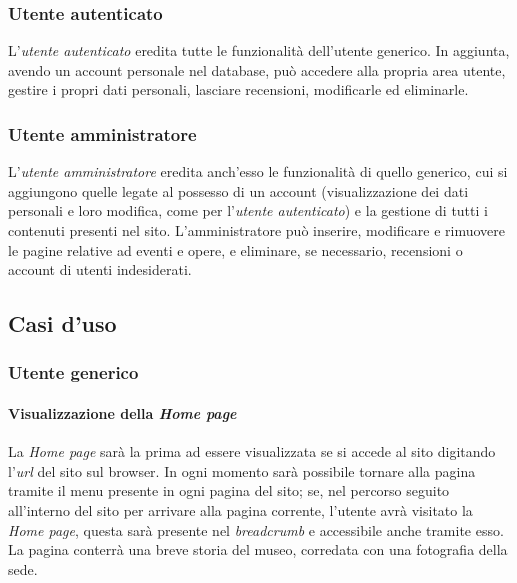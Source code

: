 \subsubsection{Utente autenticato}
\label{analisi-casi-uso-attori-principali-utente-autenticato}
L'\textit{utente autenticato} eredita tutte le funzionalità dell'utente generico. In aggiunta, avendo un account personale nel database, può accedere alla propria area utente, gestire i propri dati personali, lasciare recensioni, modificarle ed eliminarle.

\subsubsection{Utente amministratore}
\label{analisi-casi-uso-attori-principali-utente-amministratore}
L'\textit{utente amministratore} eredita anch'esso le funzionalità di quello generico, cui si aggiungono quelle legate al possesso di un account (visualizzazione dei dati personali e loro modifica, come per l'\textit{utente autenticato}) e  la gestione di tutti i contenuti presenti nel sito. L'amministratore può inserire, modificare e rimuovere le pagine relative ad eventi e opere, e eliminare, se necessario, recensioni o account di utenti indesiderati.


\subsection{Casi d'uso}
\label{analisi-casi-uso}

\subsubsection{Utente generico}
\label{analisi-casi-uso-attori-principali-utente-generico}

\paragraph{Visualizzazione della \textit{Home page}}
\label{analisi-casi-uso-attori-principali-utente-generico-1}
La \textit{Home page} sarà la prima ad essere visualizzata se si accede al sito digitando l'\textit{url} del sito sul browser. In ogni momento sarà possibile tornare alla pagina tramite il menu presente in ogni pagina del sito; se, nel percorso seguito all'interno del sito per arrivare alla pagina corrente, l'utente avrà visitato la \textit{Home page}, questa sarà presente nel \textit{breadcrumb} e accessibile anche tramite esso. La pagina conterrà una breve storia del museo, corredata con una fotografia della sede.


